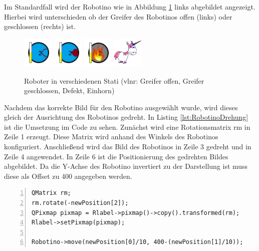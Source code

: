 Im Standardfall wird der Robotino wie in Abbildung \ref{fig:Robotino} links abgebildet angezeigt. Hierbei wird unterschieden ob der Greifer des Robotinos offen (links) oder geschlossen (rechts) ist. 

\begin{figure}[htb]
    \centering
    \includegraphics[width=0.13\textwidth]{Abbildungen/RobotinoGoffen.png}
    \includegraphics[width=0.13\textwidth]{Abbildungen/RobotinoGZu.png}
    \includegraphics[width=0.13\textwidth]{Abbildungen/RobotinoDefect.png}
    \includegraphics[width=0.13\textwidth]{Abbildungen/Einhorn.png}
    \caption{Roboter in verschiedenen Stati (vlnr: Greifer offen, Greifer geschlossen, Defekt, Einhorn)}		
    \label{fig:Robotino}
\end{figure}

Nachdem das korrekte Bild für den Robotino ausgewählt wurde, wird dieses gleich der Ausrichtung des Robotinos gedreht. In Listing \ref{lst:RobotinoDrehung} ist die Umsetzung im Code zu sehen. Zunächst wird eine Rotationsmatrix rm in Zeile 1 erzeugt. Diese Matrix wird anhand des Winkels des Robotinos konfiguriert. Anschließend wird das Bild des Robotinos in Zeile 3 gedreht und in Zeile 4 angewendet. In Zeile 6 ist die Positionierung des gedrehten Bildes abgebildet. Da die Y-Achse des Robotino invertiert zu der Darstellung ist muss diese als Offset zu 400 angegeben werden. 

\begin{lstlisting}[frame=single, breaklines=true, numbers=left, stepnumber=2, firstnumber=1, numberstyle = \tiny, caption=Robotino Drehung ,label=lst:RobotinoDrehung]
QMatrix rm;
rm.rotate(-newPosition[2]);
QPixmap pixmap = Rlabel->pixmap()->copy().transformed(rm);
Rlabel->setPixmap(pixmap);

Robotino->move(newPosition[0]/10, 400-(newPosition[1]/10));
\end{lstlisting}

